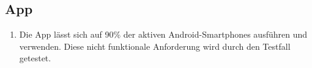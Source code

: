 \subsection*{App}

\begin{samepage}
    \begin{enumerate}[label=\textbf{/NFP\arabic*0/}, align=left]
        \item \label{/NFP10/} Die App lässt sich auf 90\% der aktiven \Gls{Android}-\Gls{Smartphone}s ausführen und verwenden. Diese nicht funktionale Anforderung wird durch den Testfall  getestet.
    \end{enumerate}
\end{samepage}